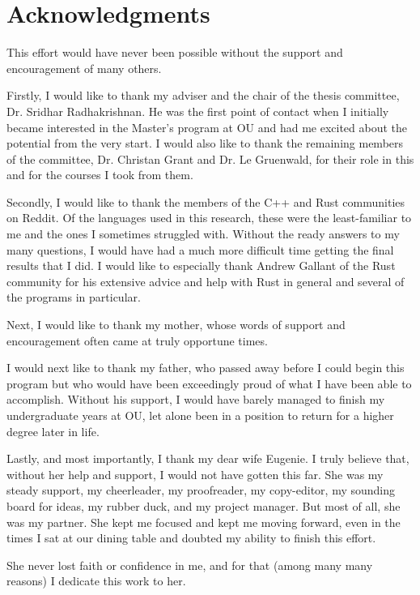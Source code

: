 \section*{Acknowledgments}

This effort would have never been possible without the support and encouragement of many others.

Firstly, I would like to thank my adviser and the chair of the thesis committee, Dr. Sridhar Radhakrishnan. He was the first point of contact when I initially became interested in the Master's program at OU and had me excited about the potential from the very start. I would also like to thank the remaining members of the committee, Dr. Christan Grant and Dr. Le Gruenwald, for their role in this and for the courses I took from them.

Secondly, I would like to thank the members of the C++ and Rust communities on Reddit. Of the languages used in this research, these were the least-familiar to me and the ones I sometimes struggled with. Without the ready answers to my many questions, I would have had a much more difficult time getting the final results that I did. I would like to especially thank Andrew Gallant of the Rust community for his extensive advice and help with Rust in general and several of the programs in particular.

Next, I would like to thank my mother, whose words of support and encouragement often came at truly opportune times.

I would next like to thank my father, who passed away before I could begin this program but who would have been exceedingly proud of what I have been able to accomplish. Without his support, I would have barely managed to finish my undergraduate years at OU, let alone been in a position to return for a higher degree later in life.

Lastly, and most importantly, I thank my dear wife Eugenie. I truly believe that, without her help and support, I would not have gotten this far. She was my steady support, my cheerleader, my proofreader, my copy-editor, my sounding board for ideas, my rubber duck, and my project manager. But most of all, she was my partner. She kept me focused and kept me moving forward, even in the times I sat at our dining table and doubted my ability to finish this effort.

She never lost faith or confidence in me, and for that (among many many reasons) I dedicate this work to her.

